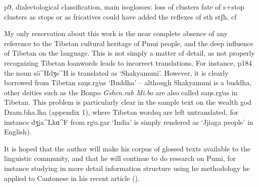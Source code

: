 \documentclass[oldfontcommands,oneside,a4paper,11pt]{article}
\newcommand{\ipa}[1]{{\phon #1}} %
\begin{document}
 

p9, dialectological classification, main isoglosses:
loss of clusters
fate of s+stop clusters as stops or as fricatives
could have added the reflexes of sth stʃh, cf    \citet{jacques11lingua}




My only reservation about this work is the near complete absence of any reference to the Tibetan cultural heritage of Pmui people, and the deep influence of Tibetan on the language. This is not simply a matter of detail, as not properly recognizing Tibetan loanwords leads to incorrect translations. For instance,  p184 the noun \ipa{sõ^Hdʒe^H} is translated as `Shakyamuni'. However, it is clearly borrowed from Tibetan \ipa{saŋs.rgʲas} `Buddha' -- although Shakyamuni is a buddha, other deities such as the Bonpo  \textit{Gshen.rab Mi.bo} are also called \ipa{saŋs.rgʲas} in Tibetan. This problem is particularly clear in the sample text on the wealth god Dzam.bha.lha (appendix 1), where Tibetan wordsq are left untranslated, for instance \ipa{dʒja^Lkɑ^F} from \ipa{rgʲa.gar} `India' is simply rendered as `Jjiaga people' in English).


It is hoped that the author will make his corpus of glossed texts available to the linguistic community, and that he will continue to do research on Pumi, for instance studying in more detail information structure  using he methodology he applied to Cantonese in his recent article (\citealt{ding14cantonese}).




 
\end{document}
